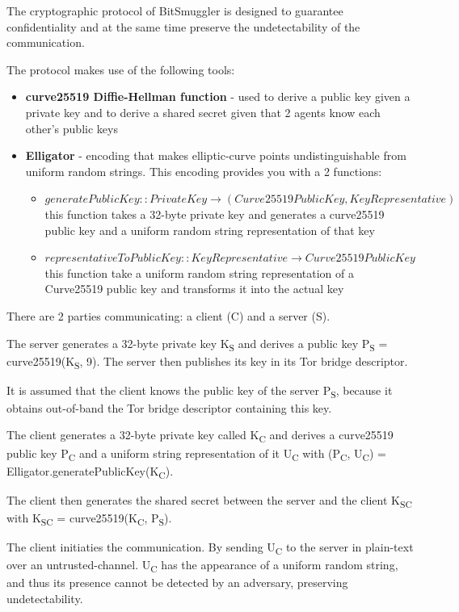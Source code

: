\documentclass[11pt]{article} %
\newcommand{\projectName}{BitSmuggler }
\begin{document}
The cryptographic protocol of \projectName is designed to guarantee confidentiality and at the same time preserve the undetectability of the communication.

The protocol makes use of the following tools:
\begin{itemize}
\item \textbf{curve25519 Diffie-Hellman function} - used to derive a public key given a private key and to derive a shared secret given that 2 agents know each other's public keys
\item \textbf{Elligator} - encoding that makes elliptic-curve points undistinguishable from uniform random strings. This encoding provides you with a 2 functions: 
\begin{itemize}
\item \( generatePublicKey :: PrivateKey \rightarrow (Curve25519PublicKey, KeyRepresentative) \)
this function takes a 32-byte private key and generates a curve25519 public key and a uniform random string representation of that key
\item \(representativeToPublicKey :: KeyRepresentative \rightarrow Curve25519PublicKey  \)
this function take a uniform random string representation of a Curve25519 public key and transforms it into the actual key
\end{itemize}
\end{itemize}

There are 2 parties communicating: a client (C) and a server (S).

The server generates a 32-byte private key K\textsubscript{S} and derives a public key P\textsubscript{S} = curve25519(K\textsubscript{S}, 9). The server then publishes its key in its Tor bridge descriptor.

 It is assumed that the client knows the public key of the server P\textsubscript{S}, because it obtains out-of-band the Tor bridge descriptor containing this key.

The client generates a 32-byte private key called K\textsubscript{C} and derives a curve25519 public key P\textsubscript{C} and a uniform string representation of it U\textsubscript{C} with (P\textsubscript{C}, U\textsubscript{C}) = Elligator.generatePublicKey(K\textsubscript{C}).

The client then generates the shared secret between the server and the client K\textsubscript{SC} with K\textsubscript{SC} = curve25519(K\textsubscript{C},  P\textsubscript{S}).

The client initiaties the communication. By sending U\textsubscript{C} to the server in plain-text over an untrusted-channel. U\textsubscript{C} has the appearance of a uniform random string, and thus its presence cannot be detected by an adversary, preserving undetectability.
\end{document}
